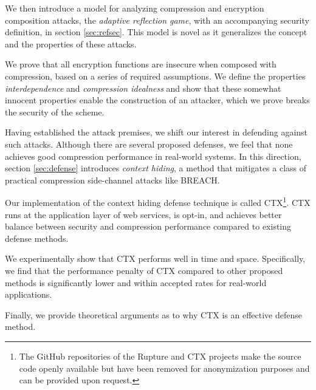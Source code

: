 We then introduce a model for analyzing compression and encryption composition
attacks, the \textit{adaptive reflection game}, with an accompanying security
definition, in section \ref{sec:refsec}. This model is novel as it generalizes
the concept and the properties of these attacks.

We prove that all encryption functions are insecure when composed with
compression, based on a series of required assumptions. We define the properties
\textit{interdependence} and \textit{compression idealness} and show that these
somewhat innocent properties enable the construction of an attacker, which we
prove breaks the security of the scheme.

Having established the attack premises, we shift our interest in defending
against such attacks. Although there are several proposed defenses, we feel that
none achieves good compression performance in real-world systems. In this
direction, section \ref{sec:defense} introduces \textit{context hiding}, a
method that mitigates a class of practical compression side-channel attacks like
BREACH.

Our implementation of the context hiding defense technique is called
CTX\footnote[1]{The GitHub repositories of the Rupture and CTX projects make the
source code openly available but have been removed for anonymization purposes
and can be provided upon request.}. CTX runs at the application layer of web
services, is opt-in, and achieves better balance between security and
compression performance compared to existing defense methods.

We experimentally show that CTX performs well in time and space. Specifically,
we find that the performance penalty of CTX compared to other proposed methods
is significantly lower and within accepted rates for real-world applications.

Finally, we provide theoretical arguments as to why CTX is an effective defense
method.
